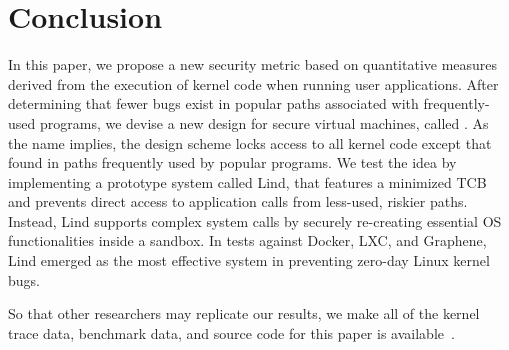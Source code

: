 \section{Conclusion}
\label{sec.conclusion}

In this paper, we propose a new security metric based on quantitative measures derived from
the execution of kernel code when running user applications.
After determining that fewer bugs exist in popular paths associated with frequently-used
programs, we devise a new design for secure virtual machines, called \lip.
As the name implies, the design scheme locks access to all
kernel code except that found in paths frequently used by
popular programs. We test the \lip idea by implementing a prototype system
called Lind, that features a minimized TCB and prevents direct access to application
calls from less-used, riskier paths.
Instead, Lind supports complex system calls by securely re-creating
essential OS functionalities inside a sandbox.
In tests against Docker, LXC, and Graphene, Lind emerged as the most effective system in preventing
zero-day Linux kernel bugs.

So that other researchers may replicate our results, we make all of the kernel
trace data, benchmark data, and source code for this paper is 
available~\cite{Lind}. 
